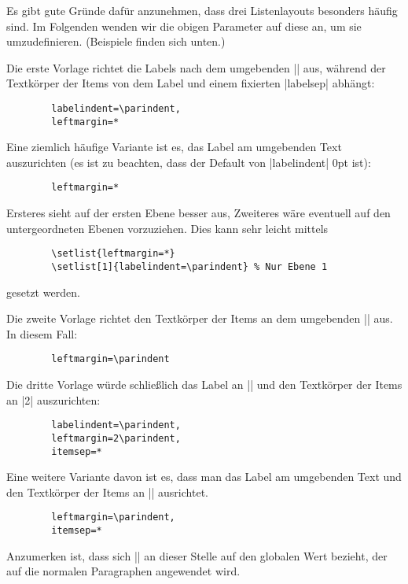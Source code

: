 \documentclass[a4paper,ngerman]{ltxguide}
\newcommand\0{\unskip\enspace\fbox{\fontsize{4}{4}\selectfont NEU 3.0}}
\newcommand\3{\unskip\enspace\fbox{\fontsize{4}{4}\selectfont NEW 3.0}}
\begin{document}
Es gibt gute Gr\"unde daf\"ur anzunehmen, dass drei Listenlayouts besonders
h\"aufig sind. Im Folgenden wenden wir die obigen Parameter auf diese an,
um sie umzudefinieren. (Beispiele finden sich unten.)
	
Die erste Vorlage richtet die Labels nach dem umgebenden |\parindent| aus,
w\"ahrend der Textk\"orper der Items von dem Label und einem fixierten
|labelsep| abh\"angt:
	
	\begin{verbatim}	
		labelindent=\parindent,
		leftmargin=*
	\end{verbatim}
	
Eine ziemlich h\"aufige Variante ist es, das Label am umgebenden Text auszurichten (es ist zu beachten, dass der 
Default von |labelindent| 0pt ist):
	
	\begin{verbatim}
		leftmargin=*	
	\end{verbatim}
	
Ersteres sieht auf der ersten Ebene besser aus, Zweiteres w\"are eventuell auf den untergeordneten Ebenen vorzuziehen. 
Dies kann sehr leicht mittels
	
	\begin{verbatim}
		\setlist{leftmargin=*}
		\setlist[1]{labelindent=\parindent} % Nur Ebene 1
	\end{verbatim}
	
gesetzt werden.
	
Die zweite Vorlage richtet den Textk\"orper der Items an dem umgebenden
|\parindent| aus. In diesem Fall:

	\begin{verbatim}
		leftmargin=\parindent		
	\end{verbatim}	
	
Die dritte Vorlage w\"urde schlie\ss lich das Label an |\parindent| und den
Textk\"orper der Items an |2\parindent| auszurichten:

	\begin{verbatim}
		labelindent=\parindent,
		leftmargin=2\parindent,
		itemsep=*
	\end{verbatim}	

Eine weitere Variante davon ist es, dass man das Label am umgebenden Text
und den Textk\"orper der Items an |\parindent| ausrichtet.

	\begin{verbatim}
		leftmargin=\parindent,
		itemsep=*
	\end{verbatim}	

Anzumerken ist, dass sich |\parindent| an dieser Stelle auf den globalen Wert bezieht, der auf die normalen 
Paragraphen angewendet wird.
\end{document}
